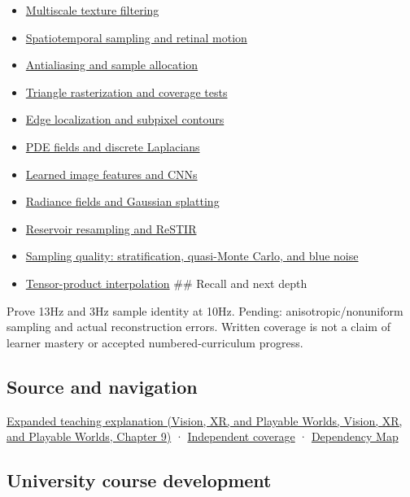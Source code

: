 \begin{itemize}
\item
  \hyperref[appendix-b677a85ba76f]{Multiscale texture filtering}
\item
  \hyperref[appendix-70895739febb]{Spatiotemporal sampling and retinal motion}
\item
  \hyperref[appendix-4192b2bdd21e]{Antialiasing and sample allocation}
\item
  \hyperref[appendix-ed3f9bc298fe]{Triangle rasterization and coverage tests}
\item
  \hyperref[appendix-36022286b03e]{Edge localization and subpixel contours}
\item
  \hyperref[appendix-1988d465c119]{PDE fields and discrete Laplacians}
\item
  \hyperref[appendix-47c51ea026fb]{Learned image features and CNNs}
\item
  \hyperref[appendix-c5b332e400e7]{Radiance fields and Gaussian splatting}
\item
  \hyperref[appendix-68be451b78b1]{Reservoir resampling and ReSTIR}
\item
  \hyperref[appendix-9f693ffd82bc]{Sampling quality: stratification, quasi-Monte Carlo, and blue noise}
\item
  \hyperref[appendix-0a09b6dfdc86]{Tensor-product interpolation} \#\# Recall and next depth
\end{itemize}

Prove 13Hz and 3Hz sample identity at 10Hz. Pending: anisotropic/nonuniform sampling and actual reconstruction errors. Written coverage is not a claim of learner mastery or accepted numbered-curriculum progress.

\subsection{Source and navigation}\label{appendix-6a7869dd79a6-source-and-navigation}

\href{../07-Vision-XR-and-Playable-Worlds/main.pdf\#nameddest=04-visual-computing-ii-ch042-sampling-is-a-question-of-what-remains-distinguishable}{Expanded teaching explanation (Vision, XR, and Playable Worlds, Vision, XR, and Playable Worlds, Chapter 9)} · \hyperref[appendix-fd090d982a15-xr01---independent-seeing-and-representation-source]{Independent coverage} · \hyperref[appendix-4ad47bdd269a]{Dependency Map}

\subsection{University course development}\label{appendix-6a7869dd79a6-university-course-development}

